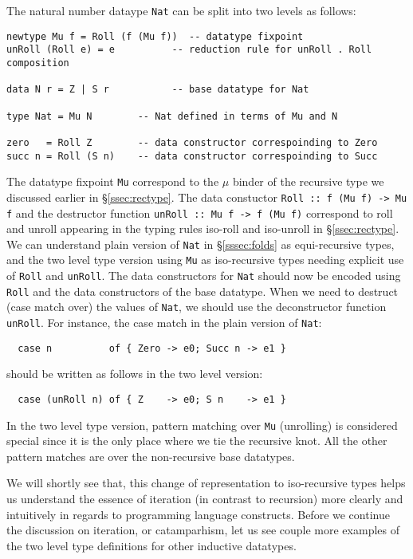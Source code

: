 The natural number dataype \texttt{Nat} can be split into two levels as follows:
\begin{verbatim}
newtype Mu f = Roll (f (Mu f))  -- datatype fixpoint
unRoll (Roll e) = e          -- reduction rule for unRoll . Roll composition

data N r = Z | S r           -- base datatype for Nat

type Nat = Mu N        -- Nat defined in terms of Mu and N

zero   = Roll Z        -- data constructor correspoinding to Zero
succ n = Roll (S n)    -- data constructor correspoinding to Succ
\end{verbatim}
The datatype fixpoint \texttt{Mu} correspond to the $\mu$ binder of
the recursive type we discussed earlier in \S\ref{ssec:rectype}.
The data constuctor \texttt{Roll :: f (Mu f) -> Mu f} and
the destructor function \texttt{unRoll :: Mu f -> f (Mu f)}
correspond to \textsf{roll} and \textsf{unroll} appearing in
the typing rules iso-roll and iso-unroll in \S\ref{ssec:rectype}.
We can understand plain version of \texttt{Nat} in \S\ref{sssec:folds}
as equi-recursive types, and the two level type version using \texttt{Mu} as
iso-recursive types needing explicit use of \texttt{Roll} and \texttt{unRoll}.
The data constructors for \texttt{Nat} should now be encoded using \texttt{Roll}
and the data constructors of the base datatype. When we need to destruct
(\ie case match over) the values of \texttt{Nat}, we should use
the deconstructor function \texttt{unRoll}.
For instance, the case match in the plain version of \texttt{Nat}:
\begin{verbatim}
  case n          of { Zero -> e0; Succ n -> e1 }
\end{verbatim}
should be written as follows in the two level version:
\begin{verbatim}
  case (unRoll n) of { Z    -> e0; S n    -> e1 }
\end{verbatim}
In the two level type version, pattern matching over \texttt{Mu}
(\ie unrolling) is considered special since it is the only place
where we tie the recursive knot. All the other pattern matches are
over the non-recursive base datatypes.

We will shortly see that, this change of representation to iso-recursive types
helps us understand the essence of iteration (in contrast to recursion) more
clearly and intuitively in regards to programming language constructs.
Before we continue the discussion on iteration, or catamparhism, let us see
couple more examples of the two level type definitions for other inductive
datatypes.

